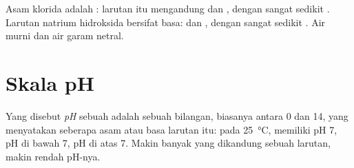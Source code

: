 \begin{example}\label{ex:g9:acids-bases-ph:three}
Asam klorida adalah : larutan itu mengandung 
 dan , dengan sangat sedikit . Larutan
natrium hidroksida bersifat basa:  dan , dengan
sangat sedikit . Air murni dan air garam netral.
\end{example}

\section{Skala pH}

\begin{definition}[pH]\label{def:g9:acids-bases-ph:ph}
Yang disebut \emph{pH} sebuah  adalah sebuah
bilangan, biasanya antara 0 dan 14, yang menyatakan seberapa asam atau
basa larutan itu: pada \qty{25}{\celsius},  memiliki pH 7,
 pH di bawah 7,  pH di atas 7. Makin banyak 
 yang dikandung sebuah larutan, makin rendah pH-nya.
\end{definition}

